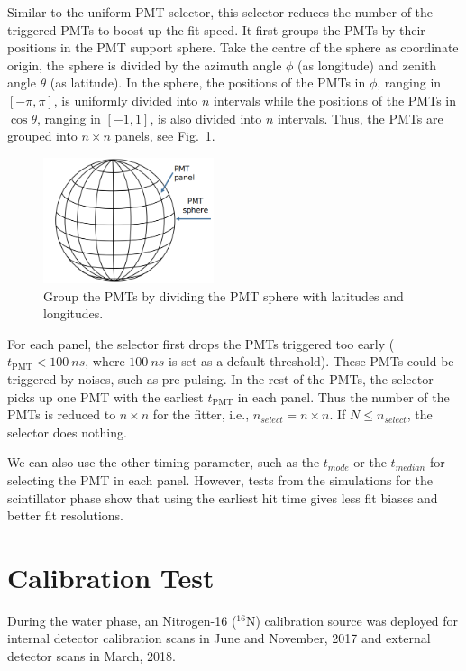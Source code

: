\begin{itemize}
Similar to the uniform PMT selector, this selector reduces the number of the triggered PMTs to boost up the fit speed. It first groups the PMTs by their positions in the PMT support sphere. Take the centre of the sphere as coordinate origin, the sphere is divided by the azimuth angle $\phi$ (as longitude) and zenith angle $\theta$ (as latitude). In the sphere, the positions of the PMTs in $\phi$, ranging in $[-\pi,\pi]$, is uniformly divided into $n$ intervals while the positions of the PMTs in $\cos\theta$, ranging in $[-1, 1]$, is also divided into $n$ intervals. Thus, the PMTs are grouped into $n\times n$ panels, see Fig.~\ref{GroupPMTs}. 
\begin{figure}[!htb]
	\centering
	\includegraphics[width=5cm]{GroupPMTs.png}
	\caption{Group the PMTs by dividing the PMT sphere with latitudes and longitudes.}
	\label{GroupPMTs}
\end{figure}

For each panel, the selector first drops the PMTs triggered too early ($t_\mathrm{PMT}<100~ns$, where $100~ns$ is set as a default threshold). These PMTs could be triggered by noises, such as pre-pulsing. In the rest of the PMTs, the selector picks up one PMT with the earliest $t_\mathrm{PMT}$ in each panel. Thus the number of the PMTs is reduced to $n\times n$ for the fitter, i.e., $n_{select}=n\times n$. If $N\leq n_{select}$, the selector does nothing. 

We can also use the other timing parameter, such as the $t_{mode}$ or the $t_{median}$ for selecting the PMT in each panel. However, tests from the simulations for the scintillator phase show that using the earliest hit time gives less fit biases and better fit resolutions.
\end{itemize}

\section{ Calibration Test}
During the water phase, an Nitrogen-16 ($^{16}$N) calibration source was deployed for internal detector calibration scans in June and November, 2017 and external detector scans in March, 2018. 

